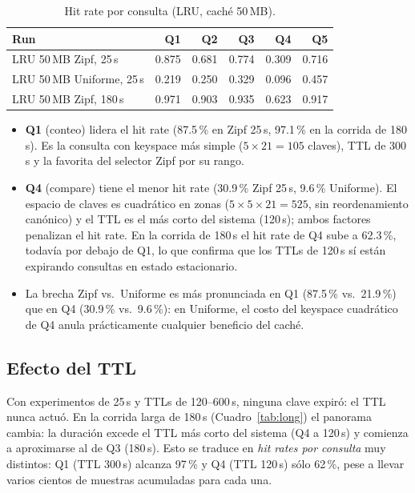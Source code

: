 \documentclass[11pt,a4paper]{article}
\begin{document}
\begin{table}[h]
\centering\small
\begin{tabular}{lrrrrr}
\toprule
\textbf{Run} & \textbf{Q1} & \textbf{Q2} & \textbf{Q3} & \textbf{Q4} & \textbf{Q5} \\
\midrule
LRU 50\,MB Zipf, 25\,s    & 0.875 & 0.681 & 0.774 & 0.309 & 0.716 \\
LRU 50\,MB Uniforme, 25\,s & 0.219 & 0.250 & 0.329 & 0.096 & 0.457 \\
LRU 50\,MB Zipf, 180\,s   & 0.971 & 0.903 & 0.935 & 0.623 & 0.917 \\
\bottomrule
\end{tabular}
\caption{Hit rate por consulta (LRU, caché 50\,MB).}\label{tab:byquery}
\end{table}

\begin{itemize}[leftmargin=*]
\item \textbf{Q1} (conteo) lidera el hit rate (87.5\,\% en Zipf 25\,s,
  97.1\,\% en la corrida de 180\,s). Es la consulta con keyspace más simple
  ($5 \times 21 = 105$ claves), TTL de 300\,s y la favorita del selector
  Zipf por su rango.
\item \textbf{Q4} (compare) tiene el menor hit rate (30.9\,\% Zipf 25\,s,
  9.6\,\% Uniforme). El espacio de claves es cuadrático en zonas
  ($5 \times 5 \times 21 = 525$, sin reordenamiento canónico) y el TTL es
  el más corto del sistema (120\,s); ambos factores penalizan el hit rate.
  En la corrida de 180\,s el hit rate de Q4 sube a 62.3\,\%, todavía por
  debajo de Q1, lo que confirma que los TTLs de 120\,s sí están expirando
  consultas en estado estacionario.
\item La brecha Zipf vs.\ Uniforme es más pronunciada en Q1
  (87.5\,\% vs.\ 21.9\,\%) que en Q4 (30.9\,\% vs.\ 9.6\,\%): en Uniforme,
  el costo del keyspace cuadrático de Q4 anula prácticamente cualquier
  beneficio del caché.
\end{itemize}

\subsection{Efecto del TTL}

Con experimentos de 25\,s y TTLs de 120--600\,s, ninguna clave expiró: el
TTL nunca actuó. En la corrida larga de 180\,s (Cuadro~\ref{tab:long}) el
panorama cambia: la duración excede el TTL más corto del sistema (Q4 a
120\,s) y comienza a aproximarse al de Q3 (180\,s). Esto se traduce en
\emph{hit rates por consulta} muy distintos: Q1 (TTL 300\,s) alcanza 97\,\%
y Q4 (TTL 120\,s) sólo 62\,\%, pese a llevar varios cientos de muestras
acumuladas para cada una.
\end{document}
